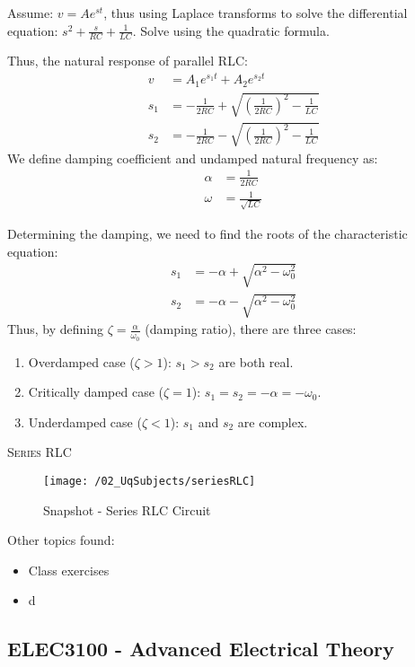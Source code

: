 Assume: $v = Ae^{st}$, thus using Laplace transforms to solve the differential equation: $s^2 + \frac{s}{RC} + \frac{1}{LC}$. Solve using the quadratic formula.

Thus, the natural response of parallel RLC:
\begin{align}
  v &= A_1 e^{s_1 t} + A_2 e^{s_2 t} \\
  s_1 &= -\frac{1}{2RC} + \sqrt{(\frac{1}{2RC})^2 - \frac{1}{LC}} \\
  s_2 &= -\frac{1}{2RC} - \sqrt{(\frac{1}{2RC})^2 - \frac{1}{LC}}
\end{align}
We define damping coefficient and undamped natural frequency as:
\begin{align}
  \alpha &= \frac{1}{2RC} \\
  \omega &= \frac{1}{\sqrt{LC}}
\end{align}

Determining the damping, we need to find the roots of the characteristic equation:
\begin{align}
  s_1 &= -\alpha + \sqrt{\alpha^2 - \omega_0^2} \\
  s_2 &= -\alpha - \sqrt{\alpha^2 - \omega_0^2}
\end{align}
Thus, by defining $\zeta = \frac{\alpha}{\omega_0}$ (damping ratio), there are three cases:
\begin{enumerate}
  \item Overdamped case ($\zeta > 1$): $s_1 > s_2$ are both real.
  \item Critically damped case ($\zeta = 1$): $s_1 = s_2 = -\alpha = -\omega_0$.
  \item Underdamped case ($\zeta < 1$): $s_1$ and $s_2$ are complex.
\end{enumerate}

\textsc{\large Series RLC}\\
\begin{figure}
  \texttt{[image: /02\_UqSubjects/seriesRLC]}
  \caption{Snapshot - Series RLC Circuit}
  \label{fig_seriesRLC}
\end{figure}

Other topics found:
\begin{itemize}
  \item Class exercises
  \item d
\end{itemize}

\clearpage

\subsection{ELEC3100 - Advanced Electrical Theory}
\clearpage


